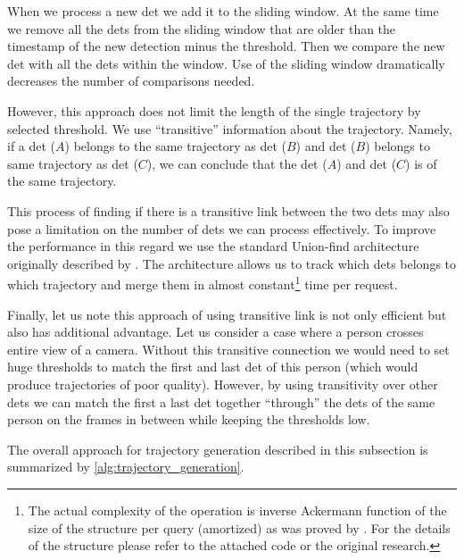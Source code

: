 When we process a new \gls{det} we add it to the sliding window. At the same time we remove all the \glspl{det} from the sliding window that are older than the timestamp of the new detection minus the threshold. Then we compare the new \gls{det} with all the \glspl{det} within the window. Use of the sliding window dramatically decreases the number of comparisons needed.

However, this approach does not limit the length of the single trajectory by selected threshold. We use ``transitive'' information about the trajectory. Namely, if a \gls{det} ($A$) belongs to the same trajectory as \gls{det} ($B$) and \gls{det} ($B$) belongs to same trajectory as \gls{det} ($C$), we can conclude that the \gls{det} ($A$) and \gls{det} ($C$) is of the same trajectory.

This process of finding if there is a transitive link between the two \glspl{det} may also pose a limitation on the number of \glspl{det} we can process effectively. To improve the performance in this regard we use the standard Union-find architecture originally described by \cite{galler1964improved}. The architecture allows us to track which \glspl{det} belongs to which trajectory and merge them in almost constant\footnote{The actual complexity of the operation is inverse Ackermann function of the size of the structure per query (amortized) as was proved by \cite{tarjan1984worst}. For the details of the structure please refer to the attached code or the original research.} time per request.

Finally, let us note this approach of using transitive link is not only efficient but also has additional advantage. Let us consider a case where a person crosses entire view of a camera. Without this transitive connection we would need to set huge thresholds to match the first and last \gls{det} of this person (which would produce trajectories of poor quality). However, by using transitivity over other \glspl{det} we can match the first a last \gls{det} together ``through'' the \glspl{det} of the same person on the frames in between while keeping the thresholds low.

The overall approach for trajectory generation described in this subsection is summarized by \autoref{alg:trajectory_generation}.

